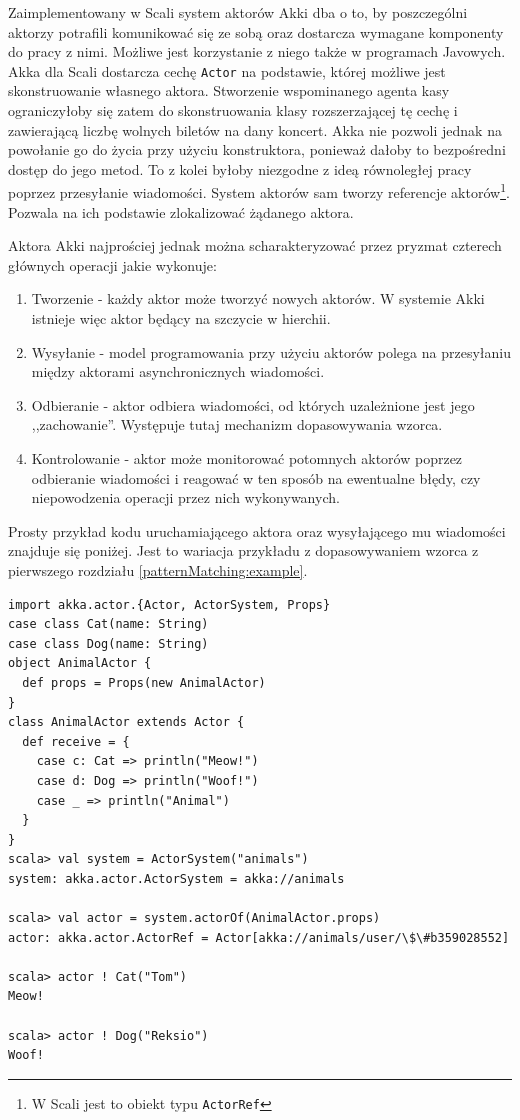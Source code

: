 \documentclass[brudnopis]{xmgr}
\begin{document}
Zaimplementowany w Scali system aktorów Akki dba o to, by poszczególni aktorzy potrafili komunikować się ze sobą oraz dostarcza wymagane komponenty do pracy z nimi. Możliwe jest korzystanie z niego także w programach Javowych. Akka dla Scali dostarcza cechę \texttt{Actor} na podstawie, której możliwe jest skonstruowanie własnego aktora. Stworzenie wspominanego agenta kasy ograniczyłoby się zatem do skonstruowania klasy rozszerzającej tę cechę i zawierającą liczbę wolnych biletów na dany koncert. Akka nie pozwoli jednak na powołanie go do życia przy użyciu konstruktora, ponieważ dałoby to bezpośredni dostęp do jego metod. To z kolei byłoby niezgodne z ideą równoległej pracy poprzez przesyłanie wiadomości. System aktorów sam tworzy referencje aktorów\footnote{W Scali jest to obiekt typu \texttt{ActorRef}}. Pozwala na ich podstawie zlokalizować żądanego aktora.

Aktora Akki najprościej jednak można scharakteryzować przez pryzmat czterech głównych operacji jakie wykonuje:

\begin{enumerate}
\item Tworzenie - każdy aktor może tworzyć nowych aktorów. W systemie Akki istnieje więc aktor będący na szczycie w hierchii.
\item Wysyłanie - model programowania przy użyciu aktorów polega na przesyłaniu między aktorami asynchronicznych wiadomości. 
\item Odbieranie - aktor odbiera wiadomości, od których uzależnione jest jego ,,zachowanie''. Występuje tutaj mechanizm dopasowywania wzorca.
\item Kontrolowanie - aktor może monitorować potomnych aktorów poprzez odbieranie wiadomości i reagować w ten sposób na ewentualne błędy, czy niepowodzenia operacji przez nich wykonywanych.
\end{enumerate}

Prosty przykład kodu uruchamiającego aktora oraz wysyłającego mu wiadomości znajduje się poniżej. Jest to wariacja przykładu z dopasowywaniem wzorca z pierwszego rozdziału \ref{patternMatching:example}.

\begin{verbatim}
import akka.actor.{Actor, ActorSystem, Props}
case class Cat(name: String)
case class Dog(name: String)
object AnimalActor {
  def props = Props(new AnimalActor)
}
class AnimalActor extends Actor {
  def receive = {
    case c: Cat => println("Meow!")
    case d: Dog => println("Woof!")
    case _ => println("Animal")
  }
}
scala> val system = ActorSystem("animals")
system: akka.actor.ActorSystem = akka://animals

scala> val actor = system.actorOf(AnimalActor.props)
actor: akka.actor.ActorRef = Actor[akka://animals/user/\$\#b359028552]

scala> actor ! Cat("Tom")
Meow!

scala> actor ! Dog("Reksio")
Woof!
\end{verbatim}
\end{document}

